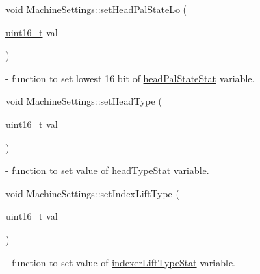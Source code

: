 \mbox{\label{classMachineSettings_ad1db42477cae871db33526bf828dd6a7}} 
{\footnotesize\ttfamily void Machine\+Settings\+::\texorpdfstring{set\+Head\+Pal\+State\+Lo}{setHeadPalStateLo} (\begin{DoxyParamCaption}\item[{\mbox{\hyperlink{settings_8h_a017dd44e68049ffdd31500a8cd01ba68}{uint16\+\_\+t}}}]{val }\end{DoxyParamCaption}){\ttfamily [static]}} - function to set lowest 16 bit of \hyperlink{classMachineSettings_a1543a985ca7e47a2853dcfef75227a5a}{head\+Pal\+State\+Stat} variable.

\mbox{\label{classMachineSettings_a33f6697feb74cab98d582f80bd4dd6a2}} 
{\footnotesize\ttfamily void Machine\+Settings\+::\texorpdfstring{set\+Head\+Type}{setHeadType} (\begin{DoxyParamCaption}\item[{\mbox{\hyperlink{settings_8h_a017dd44e68049ffdd31500a8cd01ba68}{uint16\+\_\+t}}}]{val }\end{DoxyParamCaption}){\ttfamily [static]}} - function to set value of \hyperlink{classMachineSettings_a1cfa5a234b9cbce7c1e1b881992e1d2e}{head\+Type\+Stat} variable.


\mbox{\label{classMachineSettings_a546ae7011ac82ecf38125c2ba534d327}} 
{\footnotesize\ttfamily void Machine\+Settings\+::\texorpdfstring{set\+Index\+Lift\+Type}{setIndexLiftType} (\begin{DoxyParamCaption}\item[{\mbox{\hyperlink{settings_8h_a017dd44e68049ffdd31500a8cd01ba68}{uint16\+\_\+t}}}]{val }\end{DoxyParamCaption}){\ttfamily [static]}} - function to set value of \hyperlink{classMachineSettings_a358c9d4ed568f50c5279c7019c97ffc2}{indexer\+Lift\+Type\+Stat} variable.


